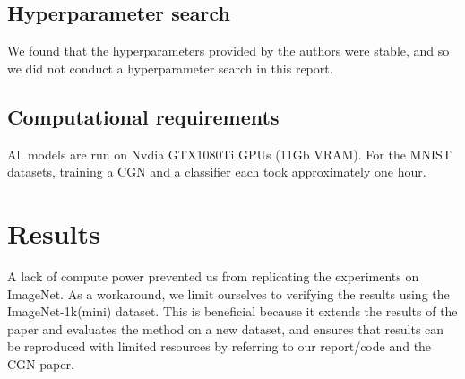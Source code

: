 \subsection{Hyperparameter search}
We found that the hyperparameters provided by the authors were stable, and so we did not conduct a hyperparameter search in this report.

\subsection{Computational requirements}
All models are run on Nvdia GTX1080Ti GPUs (11Gb VRAM). For the MNIST datasets, training a CGN and a classifier each took approximately one hour.

\section{Results}
\label{sec:results}
A lack of compute power prevented us from replicating the experiments on ImageNet. As a workaround,  we limit ourselves to verifying the results using the ImageNet-1k(mini) dataset. This is beneficial because it extends the results of the paper and evaluates the method on a new dataset, and ensures that results can be reproduced with limited resources by referring to our report/code and the CGN paper.



